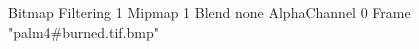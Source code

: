 {Bitmap
	{Filtering 1}
	{Mipmap 1}
	{Blend none}
	{AlphaChannel 0}
	{Frame "palm4#burned.tif.bmp"}
}
